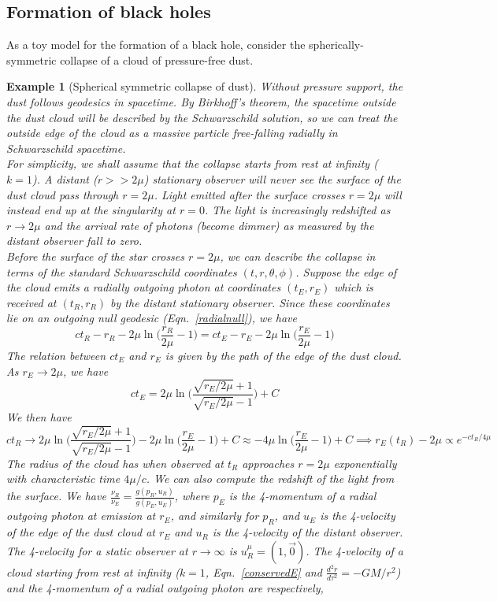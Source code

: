 \documentclass[a4paper]{article}
\newtheorem{eg}{Example}[section]
\theoremstyle{new}
\begin{document}
\subsection{Formation of black holes}
As a toy model for the formation of a black hole, consider the spherically-symmetric collapse of a cloud of pressure-free dust. 
\begin{eg}[Spherical symmetric collapse of dust]
Without pressure support, the dust follows geodesics in spacetime. By Birkhoff's theorem, the spacetime outside the dust cloud will be described by the Schwarzschild solution, so we can treat the outside edge of the cloud as a massive particle free-falling radially in Schwarzschild spacetime.\\[5pt]
For simplicity, we shall assume that the collapse starts from rest at infinity ($k=1$). A distant ($r>>2\mu$) stationary observer will never see the surface of the dust cloud pass through $r=2\mu$. Light emitted after the surface crosses $r=2\mu$ will instead end up at the singularity at $r=0$. The light is increasingly redshifted as $r\rightarrow 2\mu$ and the arrival rate of photons (become dimmer) as measured by the distant observer fall to zero.\\[5pt]
Before the surface of the star crosses $r=2\mu$, we can describe the collapse in terms of the standard Schwarzschild coordinates $(t,r,\theta,\phi)$. Suppose the edge of the cloud emits a radially outgoing photon at coordinates $(t_E,r_E)$ which is received at $(t_R,r_R)$ by the distant stationary observer. Since these coordinates lie on an outgoing null geodesic (Eqn.~\ref{radialnull}), we have
$$ct_R-r_R-2\mu\ln\bigg(\frac{r_R}{2\mu}-1\bigg)=ct_E-r_E-2\mu\ln\bigg(\frac{r_E}{2\mu}-1\bigg)$$
The relation between $ct_E$ and $r_E$ is given by the path of the edge of the dust cloud. As $r_E\rightarrow 2\mu$, we have
$$ct_E=2\mu\ln\bigg(\frac{\sqrt{r_E/2\mu}+1}{\sqrt{r_E/2\mu}-1}\bigg)+C$$
We then have
$$ct_R\rightarrow 2\mu\ln\bigg(\frac{\sqrt{r_E/2\mu}+1}{\sqrt{r_E/2\mu}-1}\bigg)-2\mu\ln\bigg(\frac{r_E}{2\mu}-1\bigg)+C\approx-4\mu\ln\bigg(\frac{r_E}{2\mu}-1\bigg)+C\implies r_E(t_R)-2\mu\propto e^{-ct_R/4\mu}$$
The radius of the cloud has when observed at $t_R$ approaches $r=2\mu$ exponentially with characteristic time $4\mu/c$. We can also compute the redshift of the light from the surface. We have $\frac{\nu_R}{\nu_E}=\frac{g(p_R,u_R)}{g(p_E,u_E)}$, where $p_E$ is the 4-momentum of a radial outgoing photon at emission at $r_E$, and similarly for $p_R$, and $u_E$ is the 4-velocity of the edge of the dust cloud at $r_E$ and $u_R$ is the 4-velocity of the distant observer. The 4-velocity for a static observer at $r\rightarrow\infty$ is $u_R^\mu=(1,\vec{0})$. The 4-velocity of a cloud starting from rest at infinity ($k=1$, Eqn.~\ref{conservedE} and $\frac{d^2r}{d\tau^2}=-GM/r^2$) and the 4-momentum of a radial outgoing photon are respectively,

\end{eg}
\end{document}
